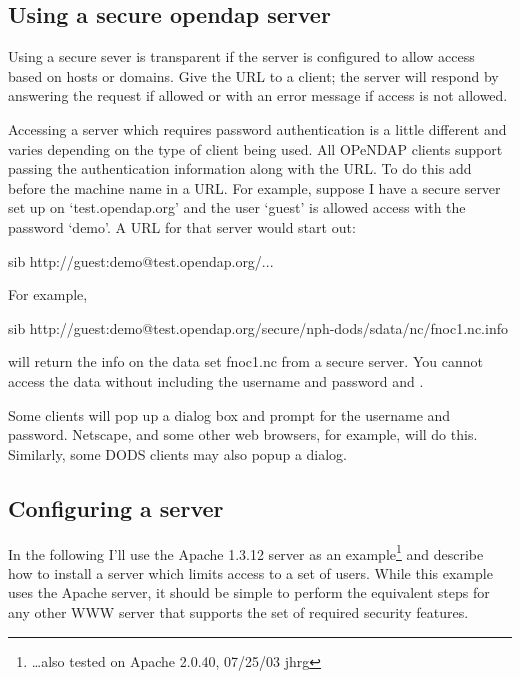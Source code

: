 \documentclass{dods-book}
\begin{document}
\subsection{Using a secure opendap server}

Using a secure sever is transparent if the server is configured to allow
access based on hosts or domains. Give the URL to a client; the server will
respond by answering the request if allowed or with an error message if
access is not allowed.

Accessing a server which requires password authentication is a little
different and varies depending on the type of client being used. All OPeNDAP
clients support passing the authentication information along with the URL. To
do this add  before the machine name in a URL. For
example, suppose I have a secure server set up on `test.opendap.org' and the
user `guest' is allowed access with the password `demo'. A URL for that
server would start out:

\begin{vcode}{sib}
    http://guest:demo@test.opendap.org/...
\end{vcode}

For example,

\begin{vcode}{sib}
    http://guest:demo@test.opendap.org/secure/nph-dods/sdata/nc/fnoc1.nc.info
\end{vcode}

will return the info on the data set fnoc1.nc from a secure server. You
cannot access the data without including the username and password 
and .

Some clients will pop up a dialog box and prompt for the username and
password. Netscape, and some other web browsers, for example, will do this.
Similarly, some DODS clients may also popup a dialog.

\subsection{Configuring a server}

In the following I'll use the Apache 1.3.12 server as an
example\footnote{\ldots also tested on Apache 2.0.40, 07/25/03 jhrg}
and describe how to install a server which limits access to a set of
users. While this example uses the Apache server, it should be simple
to perform the equivalent steps for any other WWW server that supports
the set of required security features.
\end{document}
